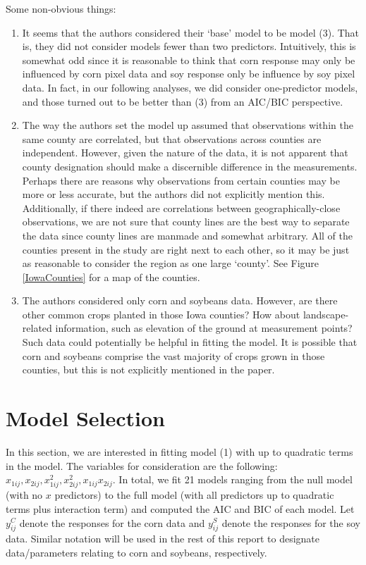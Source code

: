 \documentclass{article}
\begin{document}
Some non-obvious things:
\begin{enumerate}
	\item It seems that the authors considered their `base' model to be model (3). That is, they did not consider models fewer than two predictors. Intuitively, this is somewhat odd since it is reasonable to think that corn response may only be influenced by corn pixel data and soy response only be influence by soy pixel data. In fact, in our following analyses, we did consider one-predictor models, and those turned out to be better than (3) from an AIC/BIC perspective.
	\item The way the authors set the model up assumed that observations within the same county are correlated, but that observations across counties are independent. However, given the nature of the data, it is not apparent that county designation should make a discernible difference in the measurements. Perhaps there are reasons why observations from certain counties may be more or less accurate, but the authors did not explicitly mention this. Additionally, if there indeed are correlations between geographically-close observations, we are not sure that county lines are the best way to separate the data since county lines are manmade and somewhat arbitrary. All of the counties present in the study are right next to each other, so it may be just as reasonable to consider the region as one large `county'. See Figure \ref{IowaCounties} for a map of the counties.
	\item The authors considered only corn and soybeans data. However, are there other common crops planted in those Iowa counties? How about landscape-related information, such as elevation of the ground at measurement points? Such data could potentially be helpful in fitting the model. It is possible that corn and soybeans comprise the vast majority of crops grown in those counties, but this is not explicitly mentioned in the paper.
\end{enumerate}

\section{Model Selection}

In this section, we are interested in fitting model (1) with up to quadratic terms in the model. The variables for consideration are the following: $x_{1ij},x_{2ij},x_{1ij}^2,x_{2ij}^2,x_{1ij}x_{2ij}$. In total, we fit 21 models ranging from the null model (with no $x$ predictors) to the full model (with all predictors up to quadratic terms plus interaction term) and computed the AIC and BIC of each model. Let $y_{ij}^C$ denote the responses for the corn data and $y_{ij}^S$ denote the responses for the soy data. Similar notation will be used in the rest of this report to designate data/parameters relating to corn and soybeans, respectively.
\medbreak
\end{document}
